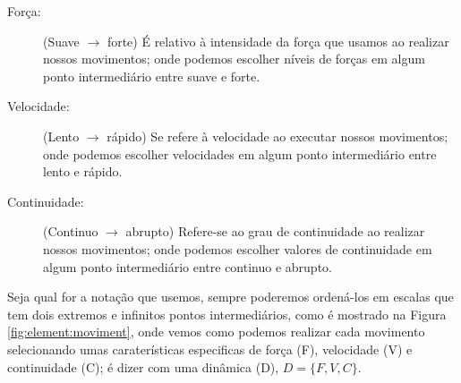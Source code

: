 \begin{description}
\item[Força:] (Suave $\rightarrow$ forte) 
É relativo à intensidade da força que usamos ao realizar nossos movimentos;
onde podemos escolher níveis de forças em algum ponto intermediário entre suave e forte. 
\end{description}

\begin{description}
\item[Velocidade:] (Lento $\rightarrow$ rápido)
Se refere à velocidade ao executar nossos movimentos;
onde podemos escolher velocidades em algum ponto intermediário entre lento e rápido. 
\item[Continuidade:] (Continuo $\rightarrow$ abrupto)
Refere-se ao grau de continuidade ao realizar nossos movimentos;
onde podemos escolher valores de continuidade em algum ponto intermediário entre continuo e abrupto.
\end{description}
Seja qual for a notação que usemos, sempre poderemos ordená-los em escalas
que tem dois extremos e infinitos pontos intermediários,
como é mostrado na Figura \ref{fig:element:moviment},
onde vemos como podemos realizar cada movimento selecionando umas caraterísticas especificas de força (F), velocidade (V) e continuidade (C);
é dizer com uma dinâmica (D),  $D=\{F, V, C\}$.
